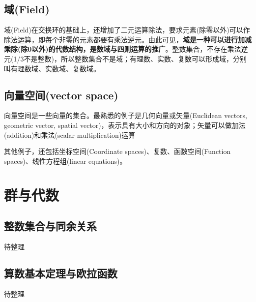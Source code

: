 \documentclass[12pt]{article}
\begin{document}
\subsection{域(Field)}
域(Field)在交换环的基础上，还增加了二元运算除法，要求元素(除零以外)可以作除法运算，即每个非零的元素都要有乘法逆元。由此可见，\textbf{域是一种可以进行加减乘除(除0以外)的代数结构，是数域与四则运算的推广}。整数集合，不存在乘法逆元(1/3不是整数)，所以整数集合不是域；有理数、实数、复数可以形成域，分别叫有理数域、实数域、复数域。

\subsection{向量空间(vector space)}
向量空间是一些向量的集合。最熟悉的例子是几何向量或矢量(Euclidean vectors, geometric vector, spatial vector)，表示具有大小和方向的对象；矢量可以做加法(addition)和乘法(scalar multiplication)运算

其他例子，还包括坐标空间(Coordinate spaces)、复数、函数空间(Function spaces)、线性方程组(linear equations)。

\section{群与代数}
\subsection{整数集合与同余关系}
待整理

\subsection{算数基本定理与欧拉函数}
待整理




\end{document}
